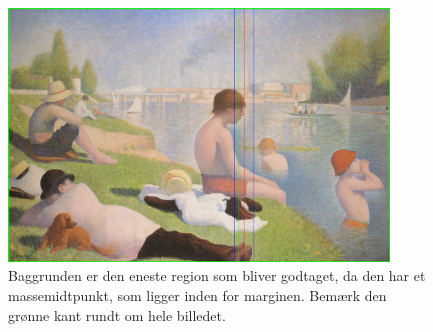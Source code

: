 \begin{figure}[h!!]
	\begin{center}
		\includegraphics[width=0.9\textwidth,angle=0]{afsnit/afprovning/billeder/udvidet_losning/udvidet_dreng.png}
	\end{center}
	\caption[]{Baggrunden er den eneste region som bliver godtaget, da den har et massemidtpunkt, som ligger inden for marginen. Bemærk den grønne kant rundt om hele billedet.}
	\label{udvidet_virker2}
\end{figure}

